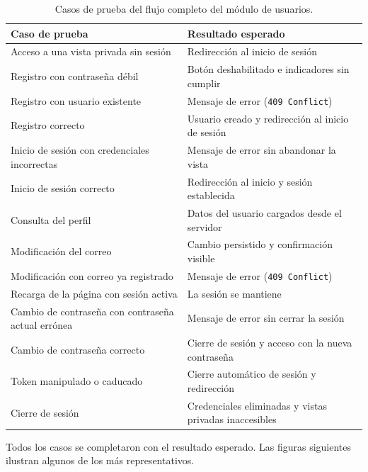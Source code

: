 \documentclass[12pt,a4paper,twoside,openright]{book}
\begin{document}
    \begin{table}[htbp]
        \centering
        \small
        \begin{tabular}{p{5.5cm} p{7.5cm}}
            \toprule
            \textbf{Caso de prueba} & \textbf{Resultado esperado} \\
            \midrule
            Acceso a una vista privada sin sesión & Redirección al inicio de sesión \\
            Registro con contraseña débil & Botón deshabilitado e indicadores sin cumplir \\
            Registro con usuario existente & Mensaje de error (\texttt{409 Conflict}) \\
            Registro correcto & Usuario creado y redirección al inicio de sesión \\
            Inicio de sesión con credenciales incorrectas & Mensaje de error sin abandonar la vista \\
            Inicio de sesión correcto & Redirección al inicio y sesión establecida \\
            Consulta del perfil & Datos del usuario cargados desde el servidor \\
            Modificación del correo & Cambio persistido y confirmación visible \\
            Modificación con correo ya registrado & Mensaje de error (\texttt{409 Conflict}) \\
            Recarga de la página con sesión activa & La sesión se mantiene \\
            Cambio de contraseña con contraseña actual errónea & Mensaje de error sin cerrar la sesión \\
            Cambio de contraseña correcto & Cierre de sesión y acceso con la nueva contraseña \\
            Token manipulado o caducado & Cierre automático de sesión y redirección \\
            Cierre de sesión & Credenciales eliminadas y vistas privadas inaccesibles \\
            \bottomrule
        \end{tabular}
        \caption{Casos de prueba del flujo completo del módulo de usuarios.}
        \label{tab:pruebas-flujo}
    \end{table}

    Todos los casos se completaron con el resultado esperado. Las figuras
    siguientes ilustran algunos de los más representativos.
\end{document}
